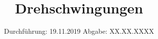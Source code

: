 

\subject{Versuchsnummer: 102}
\title{Drehschwingungen}
\date{%
  Durchführung: 19.11.2019
  \hspace{3em}
  Abgabe: XX.XX.XXXX
}



\maketitle
\thispagestyle{empty}
\tableofcontents
\newpage





\newpage
\printbibliography{}


